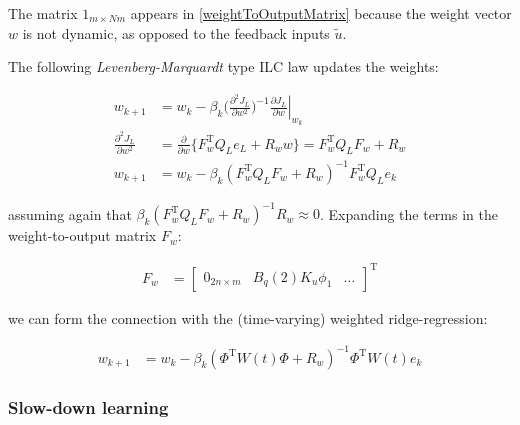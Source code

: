 \documentclass[10pt,a4paper]{article}
\newcommand\at[2]{\left.#1\right|_{#2}} %
\newcommand{\joint}{q} %
\newcommand{\error}{e} %
\newcommand{\sysInput}{u} %
\newcommand{\linInput}{\tilde{u}} %
\newcommand{\weights}{w} %
\newcommand{\basis}{\phi} %
\newcommand{\ValueFunction}{J}
\begin{document}
The matrix $1_{m\times Nm}$ appears in \eqref{weightToOutputMatrix} because the weight vector $\weights$ is not dynamic, as opposed to the feedback inputs $\linInput$.

The following \emph{Levenberg-Marquardt} type ILC law updates the weights:

\begin{equation}
\begin{aligned}
\weights_{k+1} &= \weights_k - \beta_k\Big(\frac{\partial^{2}\ValueFunction_L}{\partial\weights^{2}}\Big)^{-1}\at{\frac{\partial{\ValueFunction_L}}{\partial{\weights}}}{\weights_k} \\
\frac{\partial^{2}\ValueFunction_L}{\partial\weights^{2}} &= \frac{\partial}{\partial\weights}\{F_{\weights}^{\mathrm{T}}Q_L\error_L + R_{\weights}\weights\} = F_{\weights}^{\mathrm{T}}Q_LF_{\weights} + R_{\weights} \\
\weights_{k+1} &= \weights_k - \beta_k(F_{\weights}^{\mathrm{T}}Q_LF_{\weights} + R_{\weights})^{-1}F_{\weights}^{\mathrm{T}}Q_L\error_k
\end{aligned}
\label{ILCWeightsNewtonsMethod}
\end{equation}

assuming again that $\beta_k(F_{\weights}^{\mathrm{T}}Q_LF_{\weights} + R_{\weights})^{-1}R_{\weights} \approx 0$. Expanding the terms in the weight-to-output matrix $F_{\weights}$:

\begin{equation}
\begin{aligned}
F_{\weights} &= \begin{bmatrix}
  0_{2n \times m} & B_{\joint}(2)K_{\sysInput}\basis_{1} & \ldots
 \end{bmatrix}^{\mathrm{T}}
\end{aligned}
\label{weightToOutputMatrixExpanded}
\end{equation}

we can form the connection with the (time-varying) weighted ridge-regression:

\begin{equation}
\begin{aligned}
\weights_{k+1} &= \weights_k - \beta_k(\Phi^{\mathrm{T}}W(t)\Phi + R_{\weights})^{-1}\Phi^{\mathrm{T}}W(t)\error_k
\end{aligned}
\label{ILCWeightedRidgeRegression}
\end{equation}

\subsubsection{Slow-down learning}
\end{document}
